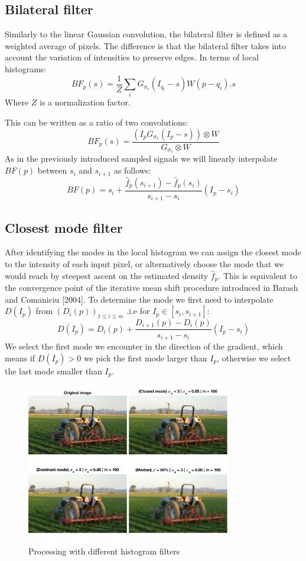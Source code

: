 \documentclass{acmsiggraph}
\newcommand{\Gv}{G_{\mathit{\sigma_v}}}
\begin{document}
\subsection{Bilateral filter}
Similarly to the linear Gaussian convolution, the bilateral filter is defined as a weighted average of pixels. The difference is that the bilateral filter takes into account the variation of intensities to preserve edges. In terms of local histograms:
\[BF_p(s) = \frac{1}{Z}\sum_i\Gv(I_{q_i}-s)W(p-q_i).s\]
Where $Z$ is a normalization factor.

This can be written as a ratio of two convolutions:
\begin{equation}
BF_p(s) = \frac{(I_p\Gv(I_p-s))\otimes W}{\Gv\otimes W} 
\end{equation}
As in the previously introduced sampled signals we will linearly interpolate $BF(p)$ between $s_i$ and $s_{i+1}$ as follows:
\[BF(p) = s_i + \frac{\hat f_p(s_{i+1}) - \hat f_p(s_{i})}{s_{i+1} -s_i}(I_p-s_i)\]  

\subsection{Closest mode filter}
After identifying the modes in the local histogram we can assign the closest mode to the intensity of each input pixel, or alternatively choose the mode that we would reach by steepest ascent on the estimated density $\hat f_p$. This is equivalent to the convergence point of the iterative mean shift procedure introduced in Barash and Comaniciu [2004]. To determine the mode we first need to interpolate $D(I_p)$ from $(D_i(p))_{1\leq i\leq m}$ .i.e for $I_p\in[s_i,s_{i+1}]$:
\[D(I_p) = D_i(p) + \frac{D_{i+1}(p)-D_i(p)}{s_{i+1}-s_i}(I_p-s_i)\]
We select the first mode we encounter in the direction of the gradient, which means if $D(I_p)>0$ we pick the first mode larger than $I_p$, otherwise we select the last mode smaller than $I_p$.
\begin{figure}[h]
\centering
\includegraphics[width=9cm]{tractor.png}
\caption{Processing with different histogram filters}
\end{figure}
\end{document}
